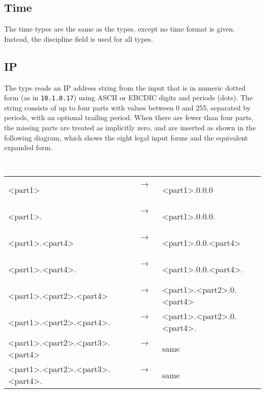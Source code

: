 \subsection{Time}

\aedBegin{}
\aedEnd{}

The time types are the same as the  types,
except no time format is given.  Instead, the \pads{}
discipline field  is used
for all  types.

\subsection{IP}

\aedBegin{}
\aedEnd{}

The  type reads an IP address string from the input that is in
numeric dotted form (as in {\tt 10.1.0.17}) using ASCII or EBCDIC
digits and periods (dots).  The string consists of up to four
parts with values between 0 and 255, separated by periods,
with an optional trailing period.  When there are
fewer than four parts, the missing parts are treated as implicitly
zero, and are inserted as shown in the following diagram,
which shows the eight legal input forms and the equivalent expanded form.

{\tt
\begin{center}
\begin{tabular}{lcl}
  <part1>                          & ~~$\longrightarrow{}$~~ & <part1>.0.0.0\\
  <part1>.                         & ~~$\longrightarrow{}$~~ & <part1>.0.0.0.\\
  <part1>.<part4>                  & ~~$\longrightarrow{}$~~ & <part1>.0.0.<part4>\\
  <part1>.<part4>.                 & ~~$\longrightarrow{}$~~ & <part1>.0.0.<part4>.\\
  <part1>.<part2>.<part4>          & ~~$\longrightarrow{}$~~ & <part1>.<part2>.0.<part4>\\
  <part1>.<part2>.<part4>.         & ~~$\longrightarrow{}$~~ & <part1>.<part2>.0.<part4>.\\
  <part1>.<part2>.<part3>.<part4>  & ~~$\longrightarrow{}$~~ & same\\
  <part1>.<part2>.<part3>.<part4>. & ~~$\longrightarrow{}$~~ & same\\
\end{tabular}
\end{center}}

